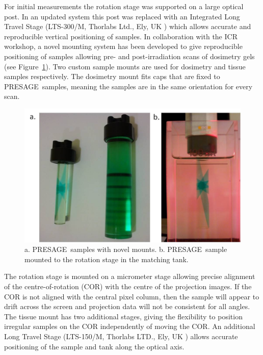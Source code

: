 For initial measurements  the rotation stage was supported on a large optical post. In an updated system this post was replaced with an Integrated Long Travel Stage (LTS-300/M, Thorlabs Ltd., Ely, UK ) which allows  accurate and reproducible vertical positioning of samples. 
In collaboration with the ICR workshop, a novel mounting system has been developed to give reproducible positioning of samples allowing pre- and post-irradiation scans of dosimetry gels (see Figure~\ref{fig:Presage_sample_mounts}). 
Two custom sample mounts are used for dosimetry and tissue samples respectively. The dosimetry mount fits caps that are fixed to PRESAGE\textregistered \ samples, meaning the samples are in the same orientation for every scan. 


\begin{figure}
\centering
\includegraphics[width=0.9\linewidth]{meth_img/Presage_sample_mounts}
\caption{a. PRESAGE\textregistered \ samples with novel mounts. b. PRESAGE\textregistered \ sample mounted to the rotation stage in the matching tank.}
\label{fig:Presage_sample_mounts}
\end{figure}



The rotation stage is mounted on a micrometer stage allowing  precise alignment of the centre-of-rotation (COR) with the centre of the projection images. If the COR is not aligned with the central pixel column, then the sample will appear to drift across the screen and projection data will not be consistent for all angles. \cite{Oldham:2006b}
The tissue mount has two additional stages, giving the flexibility to position irregular samples on the COR independently of moving the COR.   
An additional Long Travel Stage (LTS-150/M, Thorlabs LTD., Ely, UK ) allows accurate positioning of the sample and tank along the optical axis.  


